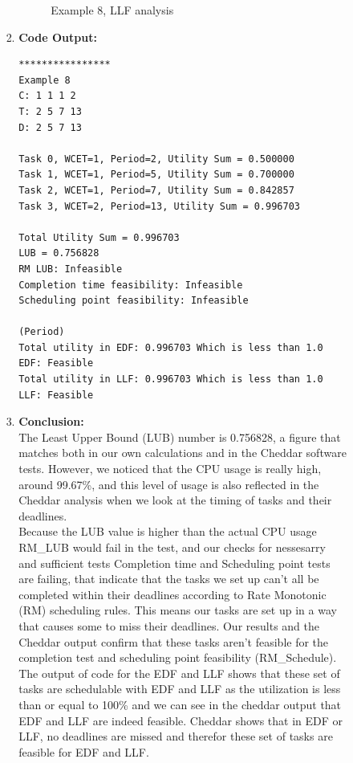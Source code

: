 \documentclass[a4paper,11pt]{article}%
\newenvironment{qanda}{\setlength{\parindent}{0pt}}{\bigskip}
\begin{document}
\begin{qanda}
\begin{enumerate}
\begin{enumerate}
\begin{enumerate}
\begin{enumerate}
\begin{figure}[H]
							                  \caption{Example 8, LLF analysis}
						                  \end{figure}
						            \item \textbf{Code Output:}\\
						                  \begin{verbatim}
****************
Example 8
C: 1 1 1 2
T: 2 5 7 13
D: 2 5 7 13

Task 0, WCET=1, Period=2, Utility Sum = 0.500000
Task 1, WCET=1, Period=5, Utility Sum = 0.700000
Task 2, WCET=1, Period=7, Utility Sum = 0.842857
Task 3, WCET=2, Period=13, Utility Sum = 0.996703

Total Utility Sum = 0.996703
LUB = 0.756828
RM LUB: Infeasible
Completion time feasibility: Infeasible
Scheduling point feasibility: Infeasible

(Period)
Total utility in EDF: 0.996703 Which is less than 1.0
EDF: Feasible
Total utility in LLF: 0.996703 Which is less than 1.0
LLF: Feasible
										\end{verbatim}
						            \item \textbf{Conclusion:}\\
						                  The Least Upper Bound (LUB) number is 0.756828, a figure that matches both in our own calculations and in the Cheddar software tests. However, we noticed that the CPU usage is really high, around 99.67\%, and this level of usage is also reflected in the Cheddar analysis when we look at the timing of tasks and their deadlines.\\

						                  Because the LUB value is higher than the actual CPU usage RM\_LUB would fail in the test, and our checks for nessesarry and sufficient tests Completion time and Scheduling point tests are failing, that indicate that the tasks we set up can't all be completed within their deadlines according to Rate Monotonic (RM) scheduling rules. This means our tasks are set up in a way that causes some to miss their deadlines. Our results and the Cheddar output confirm that these tasks aren't feasible for the completion test and scheduling point feasibility (RM\_Schedule).\\

						                  The output of code for the EDF and LLF shows that these set of tasks are schedulable with EDF and LLF as the utilization is less than or equal to 100\% and we can see in the cheddar output that EDF and LLF are indeed feasible. Cheddar shows that in EDF or LLF, no deadlines are missed and therefor these set of tasks are feasible for EDF and LLF.\\


\end{enumerate}
\end{enumerate}
\end{enumerate}
\end{enumerate}
\end{qanda}
\end{document}
